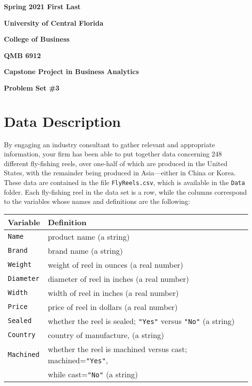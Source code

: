 \documentclass[11pt]{article}
\begin{document}

{\noindent\bf Spring 2021 \hfill First Last}
\vskip 16pt
\centerline{\bf University of Central Florida}
\centerline{\bf College of Business }
\vskip 16pt
\centerline{\bf QMB 6912}
\centerline{\bf Capstone Project in Business Analytics}
\vskip 10pt
\centerline{\bf Problem Set \#3}
\vskip 32pt
\noindent
% 
\section{Data Description}
% 
By engaging an industry consultant to gather relevant and appropriate 
information, your firm has been able to put together data concerning 248 
different fly-fishing reels, over one-half of which are produced in the 
United States, with the remainder being produced in Asia---either in China 
or Korea.  These data are contained in the file {\tt FlyReels.csv}, which is
available in the {\tt Data} folder.
Each fly-fishing reel in the data set is a row, while the columns correspond 
to the variables whose names and definitions are the following:
\bigskip
\begin{table}[ht]
\centering
\begin{tabular}{ll}
  \hline
    Variable & Definition \\
  \hline

    {\tt Name}        &product name (a string) \\ 
    {\tt Brand}       &brand name (a string) \\ 
    {\tt Weight}      &weight of reel in ounces (a real number) \\ 
    {\tt Diameter}    &diameter of reel in inches (a real number) \\ 
    {\tt Width}       &width of reel in inches (a real number) \\ 
    {\tt Price}       &price of reel in dollars (a real number) \\ 
    {\tt Sealed}      &whether the reel is sealed; {\tt "Yes"} versus
                        {\tt "No"} (a string) \\ 
    {\tt Country}     &country of manufacture, (a string) \\ 
    {\tt Machined}    &whether the reel is machined versus cast;
                        machined={\tt "Yes"}, \\ 
                      &while cast={\tt "No"} (a string) \\ 
  \hline
\end{tabular}
\end{table}
\end{document}
